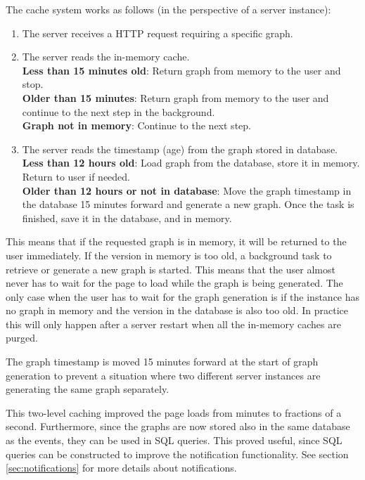 The cache system works as follows (in the perspective of a server instance):
\begin{enumerate}
    \item The server receives a HTTP request requiring a specific graph.
    \item The server reads the in-memory cache. \\
    \textbf{Less than 15 minutes old}: Return graph from memory to the user and stop. \\
    \textbf{Older than 15 minutes}: Return graph from memory to the user and continue to the next step in the background.\\
    \textbf{Graph not in memory}: Continue to the next step.
    \item The server reads the timestamp (age) from the graph stored in database.\\
    \textbf{Less than 12 hours old}: Load graph from the database, store it in memory. Return to user if needed.\\
    \textbf{Older than 12 hours or not in database}: Move the graph timestamp in the database 15 minutes forward and generate a new graph. Once the task is finished, save it in the database, and in memory.
\end{enumerate}

This means that if the requested graph is in memory, it will be returned to the user immediately. If the version in memory is too old, a background task to retrieve or generate a new graph is started. This means that the user almost never has to wait for the page to load while the graph is being generated.
The only case when the user has to wait for the graph generation is if the instance has no graph in memory and the version in the database is also too old.
In practice this will only happen after a server restart when all the in-memory caches are purged.

The graph timestamp is moved 15 minutes forward at the start of graph generation to prevent a situation where two different server instances are generating the same graph separately.

This two-level caching improved the page loads from minutes to fractions of a second. Furthermore, since the graphs are now stored also in the same database as the events, they can be used in SQL queries. This proved useful, since SQL queries can be constructed to improve the notification functionality. See section \ref{sec:notifications} for more details about notifications.

